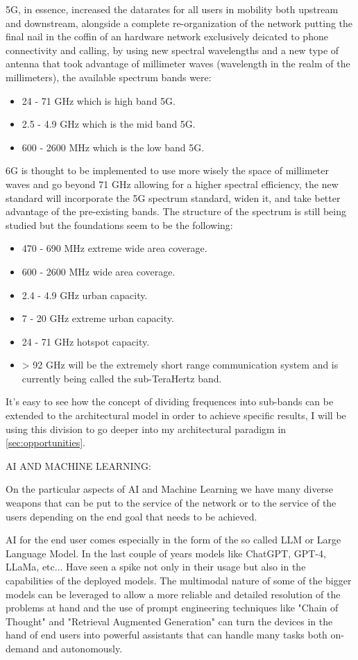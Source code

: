 5G, in essence, increased the datarates for all users in mobility both upstream and downstream,
alongside a complete re-organization of the network putting the final nail in the coffin of an
hardware network exclusively deicated to phone connectivity and calling, by using new spectral
wavelengths and a new type of antenna that took advantage of millimeter waves (wavelength in the realm of the
millimeters), the available spectrum bands were:
\begin{itemize}
	\item 24 - 71 GHz which is high band 5G.
	\item 2.5 - 4.9 GHz which is the mid band 5G.
	\item 600 - 2600 MHz which is the low band 5G.
\end{itemize}
6G is thought to be implemented to use more wisely the space of millimeter waves and go beyond 71
GHz allowing for a higher spectral efficiency, the new standard will incorporate the 5G spectrum
standard, widen it, and take better advantage of the pre-existing bands. The structure of the spectrum is still being studied but the foundations seem to be the following:
\begin{itemize}
	\item 470 - 690 MHz extreme wide area coverage.
	\item 600 - 2600 MHz wide area coverage.
	\item 2.4 - 4.9 GHz urban capacity.
	\item 7 - 20 GHz extreme urban capacity.
	\item 24 - 71 GHz hotspot capacity.
	\item > 92 GHz will be the extremely short range communication system and is currently being
	      called the sub-TeraHertz band.
\end{itemize}
It's easy to see how the concept of dividing frequences into sub-bands can be extended to the
architectural model in order to achieve specific results, I will be using this division to go
deeper into my architectural paradigm in \ref{sec:opportunities}.

\bigskip
\noindent
AI AND MACHINE LEARNING:
\label{ssec:ai-ml}

On the particular aspects of AI and Machine Learning we have many diverse weapons that can be put to
the service of the network or to the service of the users depending on the end goal that needs to
be achieved.

AI for the end user comes especially in the form of the so called LLM or Large Language Model. In
the last couple of years models like ChatGPT, GPT-4, LLaMa, etc... Have seen a spike not only in
their usage but also in the capabilities of the deployed models. The multimodal
nature of some of the bigger models can be leveraged to allow a more reliable and detailed
resolution of the problems at hand and the use of prompt engineering techniques like "Chain of
Thought" and "Retrieval Augmented Generation" can turn the devices in the hand of end users into
powerful assistants that can handle many tasks both on-demand and autonomously.

